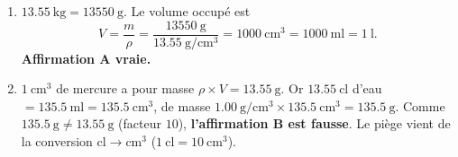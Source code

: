 \documentclass[11pt,a4paper]{article}
\begin{document}
\begin{cor}
\begin{enumerate}[label=\alph*),leftmargin=1.6em,itemsep=1pt]
  \item $\qty{13,55}{\kilo\gram}=\qty{13550}{\gram}$. Le volume occupé est
        \[ V=\frac{m}{\rho}=\frac{\qty{13550}{\gram}}{\qty{13,55}{\gram\per\centi\metre\cubed}}
           =\qty{1000}{\centi\metre\cubed}=\qty{1000}{\milli\litre}=\qty{1}{\litre}. \]
        \textbf{Affirmation A vraie.}
  \item $\qty{1}{\centi\metre\cubed}$ de mercure a pour masse $\rho\times V=\qty{13,55}{\gram}$.
        Or $\qty{13,55}{\centi\litre}$ d'eau $=\qty{135,5}{\milli\litre}=\qty{135,5}{\centi\metre\cubed}$,
        de masse $\qty{1,00}{\gram\per\centi\metre\cubed}\times\qty{135,5}{\centi\metre\cubed}=\qty{135,5}{\gram}$.
        Comme $\qty{135,5}{\gram}\neq\qty{13,55}{\gram}$ (facteur $10$), \textbf{l'affirmation B est fausse}.
        Le piège vient de la conversion $\si{\centi\litre}\rightarrow\si{\centi\metre\cubed}$
        ($\qty{1}{\centi\litre}=\qty{10}{\centi\metre\cubed}$).
\end{enumerate}
\end{cor}
\end{document}
